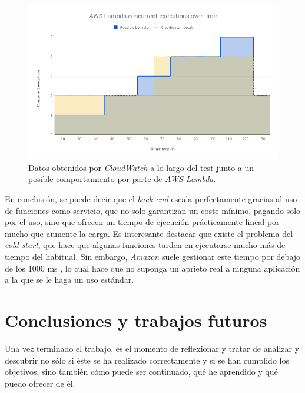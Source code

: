 \documentclass[11pt,spanish,listoffigures]{tfgetsinf}
\begin{document}
\begin{figure}[h!]
    \centering
    \includegraphics[width=1\textwidth]{images/img25.png}
    \caption{Datos obtenidos por \textit{CloudWatch} a lo largo del test junto a un posible comportamiento por parte de \textit{AWS Lambda}.}
    \label{fig:benchmark3}
\end{figure}

En conclusión, se puede decir que el \textit{back-end} escala perfectamente gracias al uso de funciones como servicio, que no solo garantizan un coste mínimo, pagando solo por el uso, sino que ofrecen un tiempo de ejecución prácticamente lineal por mucho que aumente la carga. Es interesante destacar que existe el problema del \textit{cold start}, que hace que algunas funciones tarden en ejecutarse mucho más de tiempo del habitual. Sin embargo, \textit{Amazon} suele gestionar este tiempo por debajo de los 1000 ms \cite{aws-lambda}, lo cuál hace que no suponga un aprieto real a ninguna aplicación a la que se le haga un uso estándar.



\chapter{Conclusiones y trabajos futuros}
\label{ch:conclusiones}

Una vez terminado el trabajo, es el momento de reflexionar y tratar de analizar y descubrir no sólo si éste se ha realizado correctamente y si se han cumplido los objetivos, sino también cómo puede ser continuado, qué he aprendido y qué puedo ofrecer de él.
\end{document}

